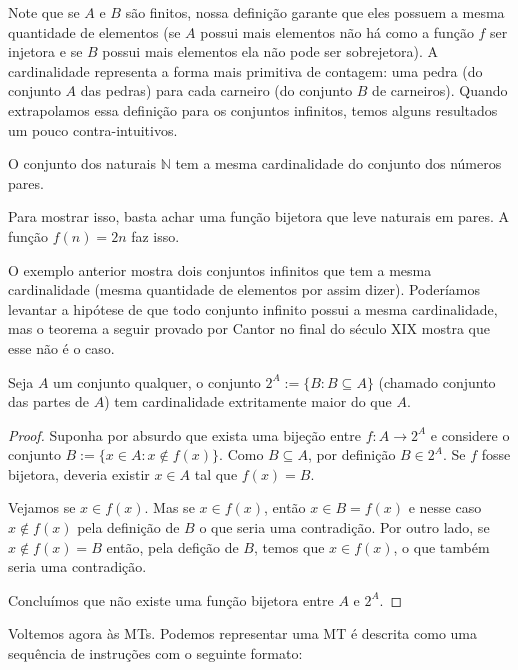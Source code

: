 
Note que se $A$ e $B$ são finitos, nossa definição garante que eles possuem a mesma quantidade de elementos (se $A$ possui mais elementos não há como a função $f$ ser injetora e se $B$ possui mais elementos ela não pode ser sobrejetora).
A cardinalidade representa a forma mais primitiva de contagem: uma pedra (do conjunto $A$ das pedras) para cada carneiro (do conjunto $B$ de carneiros).
Quando extrapolamos essa definição para os conjuntos infinitos, temos alguns resultados um pouco contra-intuitivos.

\begin{example}
  O conjunto dos naturais $\mathbb{N}$ tem a mesma cardinalidade do conjunto dos números pares.
  
  Para mostrar isso, basta achar uma função bijetora que leve naturais em pares.
  A função $f(n) = 2n$ faz isso.
\end{example}

O exemplo anterior mostra dois conjuntos infinitos que tem a mesma cardinalidade (mesma quantidade de elementos por assim dizer).
Poderíamos levantar a hipótese de que todo conjunto infinito possui a mesma cardinalidade, mas o teorema a seguir provado por Cantor no final do século XIX mostra que esse não é o caso.

\begin{theorem}[Cantor]
  Seja $A$ um conjunto qualquer, o conjunto $2^A := \{B : B \subseteq A\}$ (chamado conjunto das partes de $A$) tem cardinalidade extritamente maior do que $A$.
\end{theorem}
\begin{proof}
  Suponha por absurdo que exista uma bijeção entre $f: A \to 2^A$ e considere o conjunto $B := \{x \in A : x \notin f(x)\}$.
  Como $B \subseteq A$, por definição $B \in 2^A$.
  Se $f$ fosse bijetora, deveria existir $x \in A$ tal que $f(x) = B$.

  Vejamos se $x \in f(x)$.
  Mas se $x \in f(x)$, então $x \in B = f(x)$ e nesse caso $x \notin f(x)$ pela definição de $B$ o que seria uma contradição.
  Por outro lado, se $x \notin f(x) = B$ então, pela defição de $B$, temos que $x \in f(x)$, o que também seria uma contradição.

  Concluímos que não existe uma função bijetora entre $A$ e $2^A$.
\end{proof}

Voltemos agora às MTs.
Podemos representar uma MT é descrita como uma sequência de instruções com o seguinte formato:

